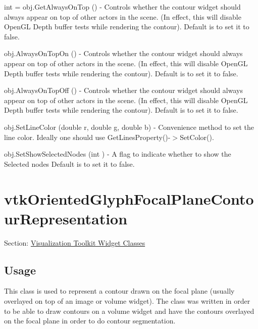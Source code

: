 \begin{DoxyItemize}
\item {\ttfamily int = obj.\-Get\-Always\-On\-Top ()} -\/ Controls whether the contour widget should always appear on top of other actors in the scene. (In effect, this will disable Open\-G\-L Depth buffer tests while rendering the contour). Default is to set it to false.  
\item {\ttfamily obj.\-Always\-On\-Top\-On ()} -\/ Controls whether the contour widget should always appear on top of other actors in the scene. (In effect, this will disable Open\-G\-L Depth buffer tests while rendering the contour). Default is to set it to false.  
\item {\ttfamily obj.\-Always\-On\-Top\-Off ()} -\/ Controls whether the contour widget should always appear on top of other actors in the scene. (In effect, this will disable Open\-G\-L Depth buffer tests while rendering the contour). Default is to set it to false.  
\item {\ttfamily obj.\-Set\-Line\-Color (double r, double g, double b)} -\/ Convenience method to set the line color. Ideally one should use Get\-Lines\-Property()-\/$>$Set\-Color().  
\item {\ttfamily obj.\-Set\-Show\-Selected\-Nodes (int )} -\/ A flag to indicate whether to show the Selected nodes Default is to set it to false.  
\end{DoxyItemize}\hypertarget{vtkwidgets_vtkorientedglyphfocalplanecontourrepresentation}{}\section{vtk\-Oriented\-Glyph\-Focal\-Plane\-Contour\-Representation}\label{vtkwidgets_vtkorientedglyphfocalplanecontourrepresentation}
Section\-: \hyperlink{sec_vtkwidgets}{Visualization Toolkit Widget Classes} \hypertarget{vtkwidgets_vtkxyplotwidget_Usage}{}\subsection{Usage}\label{vtkwidgets_vtkxyplotwidget_Usage}
This class is used to represent a contour drawn on the focal plane (usually overlayed on top of an image or volume widget). The class was written in order to be able to draw contours on a volume widget and have the contours overlayed on the focal plane in order to do contour segmentation.


